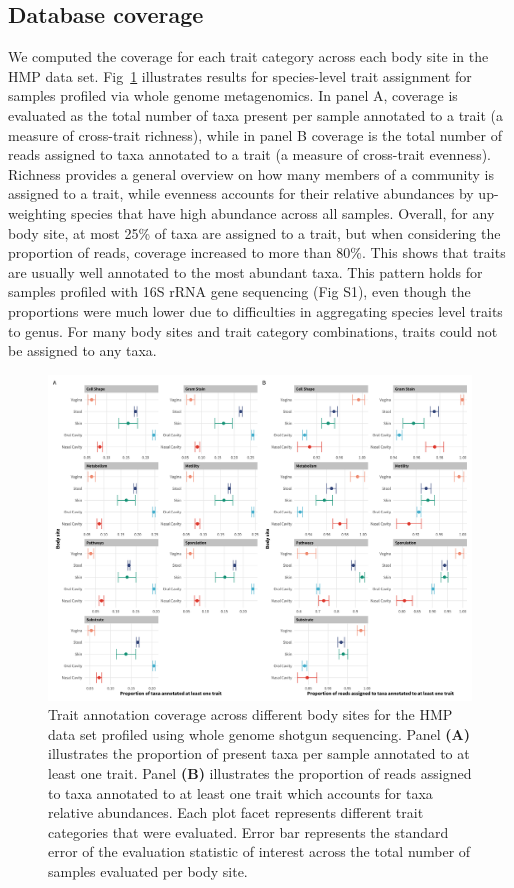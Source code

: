 \documentclass{bmcart}
\begin{document}
\subsection*{Database coverage}

We computed the coverage for each trait category across each body site in the HMP data set. Fig~\ref{fig:1} illustrates results for species-level trait assignment for samples profiled via whole genome metagenomics. In panel A, coverage is evaluated as the total number of taxa present per sample annotated to a trait (a measure of cross-trait richness), while in panel B coverage is the total number of reads assigned to taxa annotated to a trait (a measure of cross-trait evenness). Richness provides a general overview on how many members of a community is assigned to a trait, while evenness accounts for their relative abundances by up-weighting species that have high abundance across all samples. Overall, for any body site, at most 25\% of taxa are assigned to a trait, but when considering the proportion of reads, coverage increased to more than 80\%. This shows that traits are usually well annotated to the most abundant taxa.  This pattern holds for samples profiled with 16S rRNA gene sequencing (Fig S1), even though the proportions were much lower due to difficulties in aggregating species level traits to genus. For many body sites and trait category combinations, traits could not be assigned to any taxa. 

\begin{figure}[!h]
\includegraphics[width=0.99\linewidth]{figures/coverage_wgs.png}
\caption{Trait annotation coverage across different body sites for the HMP data set profiled using whole genome shotgun sequencing. Panel \textbf{(A)} illustrates the proportion of present taxa per sample annotated to at least one trait. Panel \textbf{(B)} illustrates the proportion of reads assigned to taxa annotated to at least one trait which accounts for taxa relative abundances. Each plot facet represents different trait categories that were evaluated. Error bar represents the standard error of the evaluation statistic of interest across the total number of samples evaluated per body site.}
\label{fig:1}
\end{figure}
\end{document}
